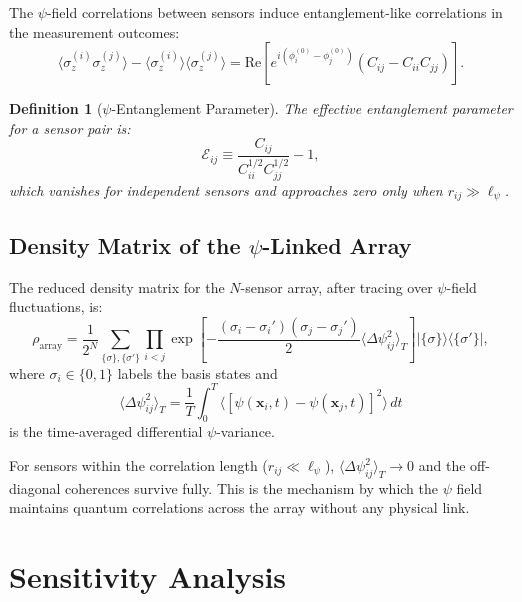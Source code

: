 \documentclass[12pt,a4paper]{article}
\newtheorem{definition}[theorem]{Definition}
\theoremstyle{remark}
\begin{document}
The $\psi$-field correlations between sensors induce entanglement-like
correlations in the measurement outcomes:
\begin{equation}
\langle\sigma_z^{(i)}\sigma_z^{(j)}\rangle - \langle\sigma_z^{(i)}\rangle\langle\sigma_z^{(j)}\rangle
= \text{Re}\left[e^{i(\phi_i^{(0)} - \phi_j^{(0)})}(C_{ij} - C_{ii}C_{jj})\right].
\label{eq:spin-correlations}
\end{equation}

\begin{definition}[$\psi$-Entanglement Parameter]\label{def:psi-entangle}
The effective entanglement parameter for a sensor pair is:
\begin{equation}
\mathcal{E}_{ij} \equiv \frac{C_{ij}}{C_{ii}^{1/2}C_{jj}^{1/2}} - 1,
\label{eq:entangle-param}
\end{equation}
which vanishes for independent sensors and approaches zero only when
$r_{ij} \gg \ell_\psi$.
\end{definition}

\subsection{Density Matrix of the $\psi$-Linked Array}\label{sec:density-matrix}

The reduced density matrix for the $N$-sensor array, after tracing over
$\psi$-field fluctuations, is:
\begin{equation}
\rho_{\text{array}} = \frac{1}{2^N}\sum_{\{\sigma\},\{\sigma'\}}
\prod_{i<j} \exp\!\left[-\frac{(\sigma_i - \sigma_i')(\sigma_j - \sigma_j')}{2}
\langle\Delta\psi_{ij}^2\rangle_T\right]
|\{\sigma\}\rangle\langle\{\sigma'\}|,
\label{eq:density-matrix}
\end{equation}
where $\sigma_i \in \{0,1\}$ labels the basis states and
\begin{equation}
\langle\Delta\psi_{ij}^2\rangle_T = \frac{1}{T}\int_0^T \langle[\psi(\mathbf{x}_i,t) - \psi(\mathbf{x}_j,t)]^2\rangle\,dt
\end{equation}
is the time-averaged differential $\psi$-variance.

For sensors within the correlation length ($r_{ij} \ll \ell_\psi$),
$\langle\Delta\psi_{ij}^2\rangle_T \to 0$ and the off-diagonal coherences
survive fully. This is the mechanism by which the $\psi$ field maintains
quantum correlations across the array without any physical link.


\section{Sensitivity Analysis}\label{sec:sensitivity}
\end{document}
